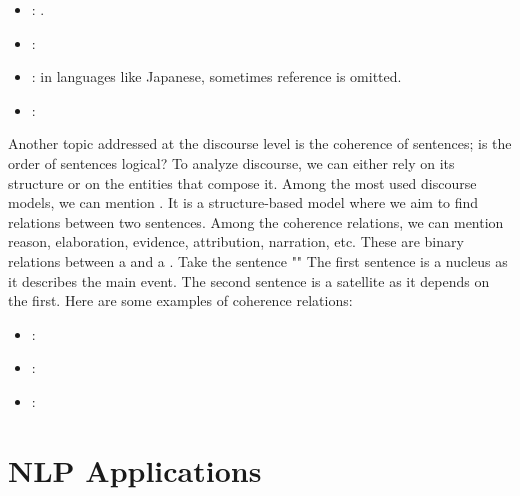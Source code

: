 \documentclass{KBook}
\begin{document}
\begin{itemize}
	\item {}: .
	\item {}: 
	\item {}: in languages like Japanese, sometimes reference is omitted.
	\item {}: 
\end{itemize}

Another topic addressed at the discourse level is the coherence of sentences; is the order of sentences logical? To analyze discourse, we can either rely on its structure or on the entities that compose it. Among the most used discourse models, we can mention . It is a structure-based model where we aim to find relations between two sentences. Among the coherence relations, we can mention reason, elaboration, evidence, attribution, narration, etc. These are binary relations between a  and a . Take the sentence "" The first sentence is a nucleus as it describes the main event. The second sentence is a satellite as it depends on the first. Here are some examples of coherence relations:

\begin{itemize}
	\item {}: 
	\item {}: 
	\item {}: 
\end{itemize}


\section{NLP Applications}
\end{document}
